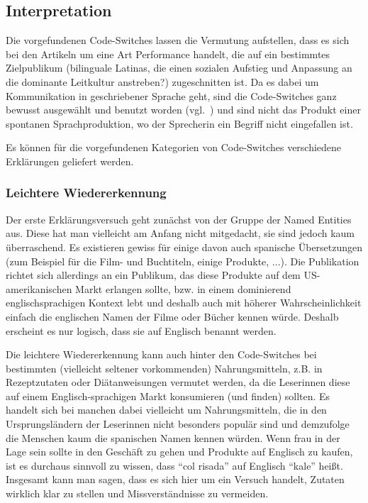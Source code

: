 \subsection{Interpretation}
\label{chap:results-analysis}

Die vorgefundenen Code-Switches lassen die Vermutung aufstellen, dass es sich bei den Artikeln um eine Art Performance handelt, die auf ein bestimmtes Zielpublikum (bilinguale Latinas, die einen sozialen Aufstieg und Anpassung an die dominante Leitkultur anstreben?) zugeschnitten ist.
Da es dabei um Kommunikation in geschriebener Sprache geht, sind die Code-Switches ganz bewusst ausgewählt und benutzt worden (vgl.~\cite{Mahootian05}) und sind nicht das Produkt einer spontanen Sprachproduktion, wo der Sprecherin ein Begriff nicht eingefallen ist.

Es können für die vorgefundenen Kategorien von Code-Switches verschiedene Erklärungen geliefert werden.

\subsubsection{Leichtere Wiedererkennung}
Der erste Erklärungsversuch geht zunächst von der Gruppe der Named Entities aus.
Diese hat man vielleicht am Anfang nicht mitgedacht, sie sind jedoch kaum überraschend.
Es existieren gewiss für einige davon auch spanische Übersetzungen (zum Beispiel für die Film- und Buchtiteln, einige Produkte, ...).
Die Publikation richtet sich allerdings an ein Publikum, das diese Produkte auf dem US-amerikanischen Markt erlangen sollte, bzw. in einem dominierend englischsprachigen Kontext lebt und deshalb auch mit höherer Wahrscheinlichkeit einfach die englischen Namen der Filme oder Bücher kennen würde.
Deshalb erscheint es nur logisch, dass sie auf Englisch benannt werden.

Die leichtere Wiedererkennung kann auch hinter den Code-Switches bei bestimmten (vielleicht seltener vorkommenden) Nahrungsmitteln, z.B. in Rezeptzutaten oder Diätanweisungen vermutet werden, da die Leserinnen diese auf einem Englisch-sprachigen Markt konsumieren (und finden) sollten.
Es handelt sich bei manchen dabei vielleicht um Nahrungsmitteln, die in den Ursprungsländern der Leserinnen nicht besonders populär sind und demzufolge die Menschen kaum die spanischen Namen kennen würden.
Wenn frau in der Lage sein sollte in den Geschäft zu gehen und Produkte auf Englisch zu kaufen, ist es durchaus sinnvoll zu wissen, dass ``col risada'' auf Englisch ``kale'' heißt.
Insgesamt kann man sagen, dass es sich hier um ein Versuch handelt, Zutaten wirklich klar zu stellen und Missverständnisse zu vermeiden.

